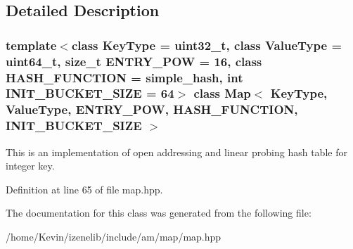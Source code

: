 \subsection{Detailed Description}
\subsubsection*{template$<$class KeyType = uint32\_\-t, class ValueType = uint64\_\-t, size\_\-t ENTRY\_\-POW = 16, class HASH\_\-FUNCTION = simple\_\-hash, int INIT\_\-BUCKET\_\-SIZE = 64$>$ class Map$<$ KeyType, ValueType, ENTRY\_\-POW, HASH\_\-FUNCTION, INIT\_\-BUCKET\_\-SIZE $>$}

This is an implementation of open addressing and linear probing hash table for integer key. 

Definition at line 65 of file map.hpp.

The documentation for this class was generated from the following file:\begin{CompactItemize}
\item 
/home/Kevin/izenelib/include/am/map/map.hpp\end{CompactItemize}
